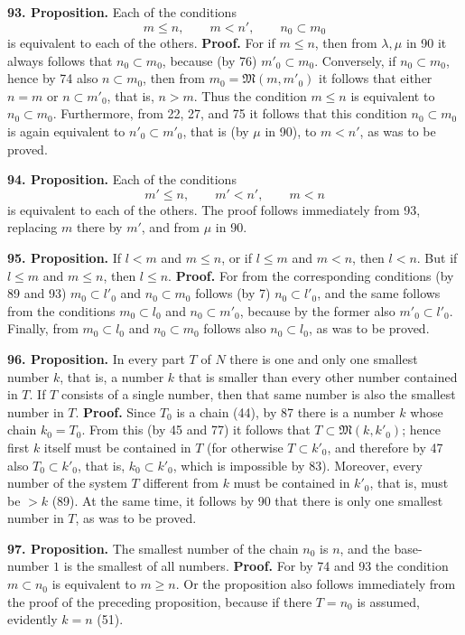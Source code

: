 \documentclass[11pt]{article}
\newcommand{\Mf}{\mathfrak{M}}
\newcommand{\partof}{\mathrel{\subset}}
\begin{document}
\noindent\textbf{93. Proposition.} Each of the conditions
\[
m\le n,\qquad m<n',\qquad n_0\partof m_0
\]
is equivalent to each of the others. \textbf{Proof.} For if $m\le n$, then from $\lambda,\mu$ in 90 it always follows that $n_0\partof m_0$, because (by 76) $m'_0\partof m_0$. Conversely, if $n_0\partof m_0$, hence by 74 also $n\partof m_0$, then from $m_0=\Mf(m,m'_0)$ it follows that either $n=m$ or $n\partof m'_0$, that is, $n>m$. Thus the condition $m\le n$ is equivalent to $n_0\partof m_0$. Furthermore, from 22, 27, and 75 it follows that this condition $n_0\partof m_0$ is again equivalent to $n'_0\partof m'_0$, that is (by $\mu$ in 90), to $m<n'$, as was to be proved.

\noindent\textbf{94. Proposition.} Each of the conditions
\[
m'\le n,\qquad m'<n',\qquad m<n
\]
is equivalent to each of the others. The proof follows immediately from 93, replacing $m$ there by $m'$, and from $\mu$ in 90.

\noindent\textbf{95. Proposition.} If $l<m$ and $m\le n$, or if $l\le m$ and $m<n$, then $l<n$. But if $l\le m$ and $m\le n$, then $l\le n$. \textbf{Proof.} For from the corresponding conditions (by 89 and 93) $m_0\partof l'_0$ and $n_0\partof m_0$ follows (by 7) $n_0\partof l'_0$, and the same follows from the conditions $m_0\partof l_0$ and $n_0\partof m'_0$, because by the former also $m'_0\partof l'_0$. Finally, from $m_0\partof l_0$ and $n_0\partof m_0$ follows also $n_0\partof l_0$, as was to be proved.

\noindent\textbf{96. Proposition.} In every part $T$ of $N$ there is one and only one smallest number $k$, that is, a number $k$ that is smaller than every other number contained in $T$. If $T$ consists of a single number, then that same number is also the smallest number in $T$. \textbf{Proof.} Since $T_0$ is a chain (44), by 87 there is a number $k$ whose chain $k_0=T_0$. From this (by 45 and 77) it follows that $T\partof\Mf(k,k'_0)$; hence first $k$ itself must be contained in $T$ (for otherwise $T\partof k'_0$, and therefore by 47 also $T_0\partof k'_0$, that is, $k_0\partof k'_0$, which is impossible by 83). Moreover, every number of the system $T$ different from $k$ must be contained in $k'_0$, that is, must be $>k$ (89). At the same time, it follows by 90 that there is only one smallest number in $T$, as was to be proved.

\noindent\textbf{97. Proposition.} The smallest number of the chain $n_0$ is $n$, and the base-number $1$ is the smallest of all numbers. \textbf{Proof.} For by 74 and 93 the condition $m\partof n_0$ is equivalent to $m\ge n$. Or the proposition also follows immediately from the proof of the preceding proposition, because if there $T=n_0$ is assumed, evidently $k=n$ (51).
\end{document}
